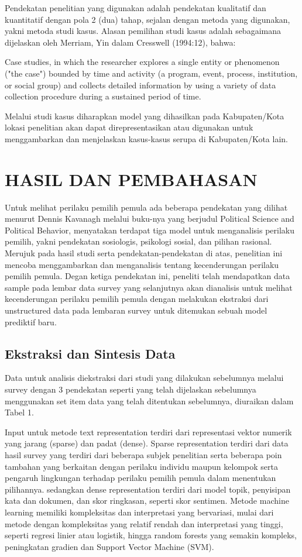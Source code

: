 \documentclass[letterpaper, 10 pt, conference]{ieeeconf}  %
\begin{document}
Pendekatan penelitian yang digunakan adalah pendekatan kualitatif dan kuantitatif dengan pola 2 (dua) tahap, sejalan dengan metoda yang digunakan, yakni metoda studi kasus. Alasan pemilihan studi kasus adalah sebagaimana dijelaskan oleh Merriam, Yin dalam Cresswell (1994:12), bahwa:

Case studies, in which the researcher explores a single entity or phenomenon ("the case") bounded by time and activity (a program, event, process, institution, or social group) and collects detailed information by using a variety of data collection procedure during a sustained period of time.

Melalui studi kasus diharapkan model yang dihasilkan pada Kabupaten/Kota lokasi penelitian akan dapat direpresentasikan atau digunakan untuk menggambarkan dan menjelaskan kasus-kasus serupa di Kabupaten/Kota lain.

\section{HASIL DAN PEMBAHASAN}

Untuk melihat perilaku pemilih pemula ada beberapa pendekatan yang dilihat menurut Dennis Kavanagh melalui buku-nya yang berjudul Political Science and Political Behavior, menyatakan terdapat tiga model untuk menganalisis perilaku pemilih, yakni pendekatan sosiologis, psikologi sosial, dan pilihan rasional. Merujuk pada hasil studi serta pendekatan-pendekatan di atas, penelitian ini mencoba menggambarkan dan menganalisis tentang kecenderungan perilaku pemilih pemula. Degan ketiga pendekatan ini, peneliti telah mendapatkan data sample pada lembar data survey yang selanjutnya akan dianalisis untuk melihat kecenderungan perilaku pemilih pemula dengan melakukan ekstraksi dari unstructured data pada lembaran survey untuk ditemukan sebuah model prediktif baru.


\subsection{Ekstraksi dan Sintesis Data} 

Data untuk analisis diekstraksi dari studi yang dilakukan sebelumnya melalui survey dengan 3 pendekatan seperti yang telah dijelaskan sebelumnya menggunakan set item data yang telah ditentukan sebelumnya, diuraikan dalam Tabel 1.

Input untuk metode text representation terdiri dari representasi vektor numerik yang jarang (sparse) dan padat (dense). Sparse representation terdiri dari data hasil survey yang terdiri dari beberapa subjek penelitian serta beberapa poin tambahan yang berkaitan dengan perilaku individu maupun kelompok serta pengaruh lingkungan terhadap perilaku pemilih pemula dalam menentukan pilihannya. sedangkan dense representation terdiri dari model topik, penyisipan kata dan dokumen, dan skor ringkasan, seperti skor sentimen. Metode machine learning memiliki kompleksitas dan interpretasi yang bervariasi, mulai dari metode dengan kompleksitas yang relatif rendah dan interpretasi yang tinggi, seperti regresi linier atau logistik, hingga random forests yang semakin kompleks, peningkatan gradien dan Support Vector Machine (SVM).
\end{document}
